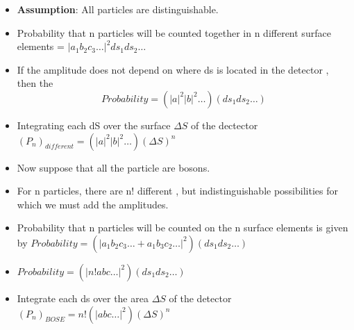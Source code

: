 \documentclass[aspectratio=169]{beamer}
\begin{document}
\begin{frame}
	\begin{itemize}
		\item \textbf{Assumption}: All particles are distinguishable. \pause \newline
		\item Probability that n particles will be counted together in n different surface elements = $\rvert a_{1}b_{2}c_{3}\ldots \rvert^2ds_1ds_2\ldots$ \pause \newline
		\item If the amplitude does not depend on where ds is located in the detector , then the
		\[ Probability = \left(\rvert a \rvert^{2}\rvert b \rvert^{2}\ldots\right)(ds_{1}ds_{2}\ldots) \]
	\end{itemize}
\end{frame} 

\begin{frame}
	\begin{itemize}
		\item Integrating each dS over the surface $\Delta S$ of the dectector \pause \newline 
		$(P_{n})_{different} = \left(\rvert a \rvert^{2}\rvert b \rvert^{2}\ldots\right)(\Delta S)^{n}$ \pause \newline
		\item Now suppose that all the particle are bosons.
		\item For n particles, there are n! different , but indistinguishable  possibilities for which we must add the amplitudes. \pause \newline
	\end{itemize}
\end{frame}

\begin{frame}
	\begin{itemize}
	\item Probability that n particles will be counted on the n surface elements is given by \pause \newline $Probability = \left(\rvert a_{1}b_{2}c_{3}\ldots + a_{1}b_{3}c_{2}\ldots \rvert^{2}\right)(ds_{1}ds_{2}\ldots)$
	\item $Probability = \left(\rvert n!abc\ldots \rvert^{2}\right)(ds_{1}ds_{2}\ldots)$
	\item Integrate each ds over the area $\Delta S$ of the detector \pause \newline
	$(P_{n})_{BOSE} = n!\left(\rvert abc\ldots \rvert^{2}\right)(\Delta S)^{n}$
	\end{itemize}
\end{frame}
\end{document}
